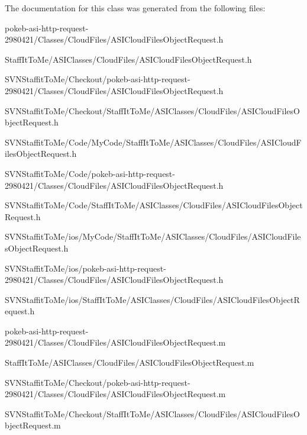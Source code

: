 \-The documentation for this class was generated from the following files\-:\begin{DoxyCompactItemize}
\item 
pokeb-\/asi-\/http-\/request-\/2980421/\-Classes/\-Cloud\-Files/\-A\-S\-I\-Cloud\-Files\-Object\-Request.\-h\item 
\-Staff\-It\-To\-Me/\-A\-S\-I\-Classes/\-Cloud\-Files/\-A\-S\-I\-Cloud\-Files\-Object\-Request.\-h\item 
\-S\-V\-N\-Staffit\-To\-Me/\-Checkout/pokeb-\/asi-\/http-\/request-\/2980421/\-Classes/\-Cloud\-Files/\-A\-S\-I\-Cloud\-Files\-Object\-Request.\-h\item 
\-S\-V\-N\-Staffit\-To\-Me/\-Checkout/\-Staff\-It\-To\-Me/\-A\-S\-I\-Classes/\-Cloud\-Files/\-A\-S\-I\-Cloud\-Files\-Object\-Request.\-h\item 
\-S\-V\-N\-Staffit\-To\-Me/\-Code/\-My\-Code/\-Staff\-It\-To\-Me/\-A\-S\-I\-Classes/\-Cloud\-Files/\-A\-S\-I\-Cloud\-Files\-Object\-Request.\-h\item 
\-S\-V\-N\-Staffit\-To\-Me/\-Code/pokeb-\/asi-\/http-\/request-\/2980421/\-Classes/\-Cloud\-Files/\-A\-S\-I\-Cloud\-Files\-Object\-Request.\-h\item 
\-S\-V\-N\-Staffit\-To\-Me/\-Code/\-Staff\-It\-To\-Me/\-A\-S\-I\-Classes/\-Cloud\-Files/\-A\-S\-I\-Cloud\-Files\-Object\-Request.\-h\item 
\-S\-V\-N\-Staffit\-To\-Me/ios/\-My\-Code/\-Staff\-It\-To\-Me/\-A\-S\-I\-Classes/\-Cloud\-Files/\-A\-S\-I\-Cloud\-Files\-Object\-Request.\-h\item 
\-S\-V\-N\-Staffit\-To\-Me/ios/pokeb-\/asi-\/http-\/request-\/2980421/\-Classes/\-Cloud\-Files/\-A\-S\-I\-Cloud\-Files\-Object\-Request.\-h\item 
\-S\-V\-N\-Staffit\-To\-Me/ios/\-Staff\-It\-To\-Me/\-A\-S\-I\-Classes/\-Cloud\-Files/\-A\-S\-I\-Cloud\-Files\-Object\-Request.\-h\item 
pokeb-\/asi-\/http-\/request-\/2980421/\-Classes/\-Cloud\-Files/\-A\-S\-I\-Cloud\-Files\-Object\-Request.\-m\item 
\-Staff\-It\-To\-Me/\-A\-S\-I\-Classes/\-Cloud\-Files/\-A\-S\-I\-Cloud\-Files\-Object\-Request.\-m\item 
\-S\-V\-N\-Staffit\-To\-Me/\-Checkout/pokeb-\/asi-\/http-\/request-\/2980421/\-Classes/\-Cloud\-Files/\-A\-S\-I\-Cloud\-Files\-Object\-Request.\-m\item 
\-S\-V\-N\-Staffit\-To\-Me/\-Checkout/\-Staff\-It\-To\-Me/\-A\-S\-I\-Classes/\-Cloud\-Files/\-A\-S\-I\-Cloud\-Files\-Object\-Request.\-m\item 

\end{DoxyCompactItemize}
